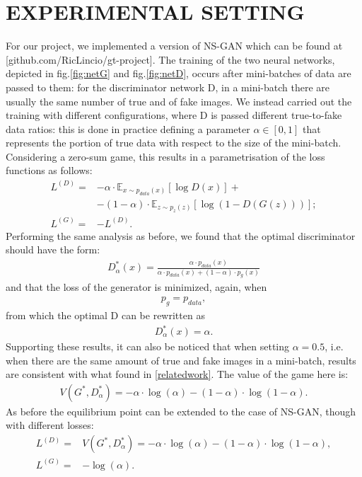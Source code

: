 \section{EXPERIMENTAL SETTING} \label{expsetting}

For our project, we implemented a version of NS-GAN which can be found at [github.com/RicLincio/gt-project]. The training of the two neural networks, depicted in fig.\ref{fig:netG} and fig.\ref{fig:netD}, occurs after mini-batches of data are passed to them: for the discriminator network D, in a mini-batch there are usually the same number of true and of fake images. We instead carried out the training with different configurations, where D is passed different true-to-fake data ratios: this is done in practice defining a parameter $\alpha\in[0,1]$ that represents the portion of true data with respect to the size of the mini-batch.
Considering a zero-sum game, this results in a parametrisation of the loss functions as follows:
\begin{equation*}
	\begin{split}
		L^{(D)} = &-\alpha\cdot\mathbb{E}_{x \sim p_{data}(x)}[\log D(x)]+\\
				  &-(1-\alpha)\cdot\mathbb{E}_{z \sim p_{z}(z)}[\log (1-D(G(z)))];\\
		L^{(G)} = &- L^{(D)}.
	\end{split}
\end{equation*}
Performing the same analysis as before, we found that the optimal discriminator should have the form:
\begin{align*}
	D_{\alpha}^*(x) = \frac{\alpha \cdot p_{data}(x)}{\alpha \cdot p_{data}(x) + (1-\alpha)\cdot p_g(x)}
\end{align*}
and that the loss of the generator is minimized, again, when
\begin{align*}
	p_g = p_{data},
\end{align*}
from which the optimal D can be rewritten as
\begin{align*}
	D_{\alpha}^*(x) = \alpha.
\end{align*}
Supporting these results, it can also be noticed that when setting $\alpha = 0.5$, i.e. when there are the same amount of true and fake images in a mini-batch, results are consistent with what found in \ref{relatedwork}. The value of the game here is:
\begin{align*}
	V(G^*,D^*_\alpha) = -\alpha\cdot\log(\alpha) - (1-\alpha)\cdot\log(1-\alpha).
\end{align*}
As before the equilibrium point can be extended to the case of NS-GAN, though with different losses:
\begin{equation*}
	\begin{split}
		L^{(D)} = &V(G^*,D^*_\alpha) = -\alpha\cdot\log(\alpha) - (1-\alpha)\cdot\log(1-\alpha),\\
		L^{(G)} = &-\log(\alpha).
	\end{split}
\end{equation*}

